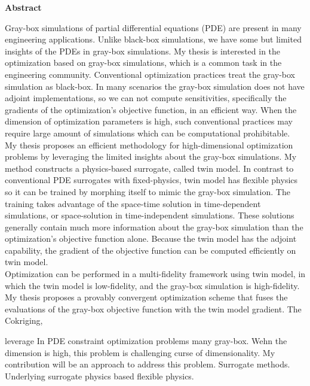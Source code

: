 \documentclass[a4paper,onecolumn]{article}
\theoremstyle{remark}
\begin{document}
\setcounter{page}{1}

$$ $$
\newpage
\hspace{.4\textwidth}
\Large\textbf{Abstract}\\
\normalsize

\noindent Gray-box simulations of partial differential equations (PDE) are
present in many engineering applications. 
Unlike black-box simulations, we have some but limited
insights of the PDEs in gray-box simulations.
My thesis is interested in the optimization based on gray-box simulations,
which is a common task in the engineering community.
Conventional optimization practices treat the gray-box simulation
as black-box. In many scenarios the gray-box simulation does not have adjoint implementations,
so we can not compute sensitivities, specifically the gradients of 
the optimization's objective function, in an efficient way. 
When the dimension of optimization parameters is high,
such conventional practices may require large amount of simulations which can be 
computational prohibitable.\\

\noindent My thesis proposes an efficient methodology for
high-dimensional optimization problems by leveraging the limited insights
about the gray-box simulations. My method constructs a physics-based surrogate, 
called twin model.
In contrast to conventional PDE surrogates with fixed-physics, twin model has
flexible physics so it can be trained by morphing itself 
to mimic the gray-box simulation. The training takes advantage of the 
space-time solution in time-dependent simulations, or space-solution in time-independent
simulations. These solutions generally contain much more information 
about the gray-box simulation than the optimization's objective function alone.
Because the twin model has the adjoint capability, the gradient of the objective function
can be computed efficiently on twin model.\\

\noindent Optimization can be performed in a multi-fidelity framework using twin model, in which
the twin model is low-fidelity, and the gray-box simulation is high-fidelity.
My thesis proposes a provably convergent optimization scheme that fuses
the evaluations of the gray-box objective function with the twin model gradient.
The 
Cokriging, 





leverage 
In PDE constraint optimization problems
many gray-box. Wehn the dimension is high, this problem is challenging curse
of dimensionality. My contribution will be an approach to
address this problem. Surrogate methods. Underlying surrogate physics based
flexible physics.
\end{document}
